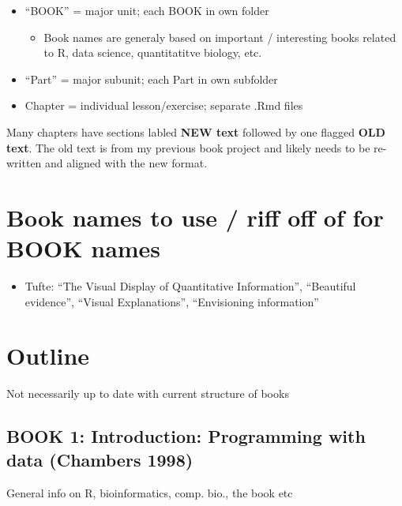 \documentclass[
]{book}
\providecommand{\tightlist}{%
  \setlength{\itemsep}{0pt}\setlength{\parskip}{0pt}}
\begin{document}
\begin{itemize}
\tightlist
\item
  ``BOOK'' = major unit; each BOOK in own folder

  \begin{itemize}
  \tightlist
  \item
    Book names are generaly based on important / interesting books related to R, data science, quantitatitve biology, etc.
  \end{itemize}
\item
  ``Part'' = major subunit; each Part in own subfolder
\item
  Chapter = individual lesson/exercise; separate .Rmd files
\end{itemize}

Many chapters have sections labled \textbf{NEW text} followed by one flagged \textbf{OLD text}. The old text is from my previous book project and likely needs to be re-written and aligned with the new format.

\hypertarget{book-names-to-use-riff-off-of-for-book-names}{%
\section{Book names to use / riff off of for BOOK names}\label{book-names-to-use-riff-off-of-for-book-names}}

\begin{itemize}
\tightlist
\item
  Tufte: ``The Visual Display of Quantitative Information'', ``Beautiful evidence'', ``Visual Explanations'', ``Envisioning information''
\end{itemize}

\hypertarget{outline}{%
\section{Outline}\label{outline}}

Not necessarily up to date with current structure of books

\hypertarget{book-1-introduction-programming-with-data-chambers-1998}{%
\subsection{BOOK 1: Introduction: Programming with data (Chambers 1998)}\label{book-1-introduction-programming-with-data-chambers-1998}}

General info on R, bioinformatics, comp. bio., the book etc
\end{document}
